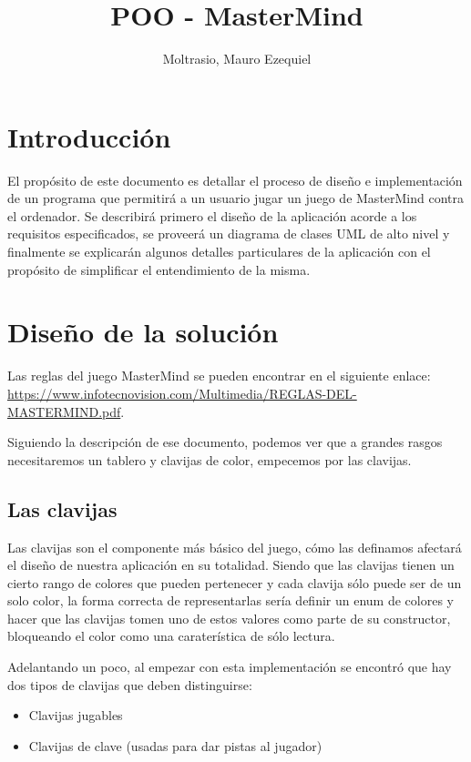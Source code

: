 \documentclass[a4paper,titlepage]{article}
\begin{document}
\title{POO - MasterMind}
\author{Moltrasio, Mauro Ezequiel}
\date{}

\maketitle
\tableofcontents

\section{Introducción}

El propósito de este documento es detallar el proceso de diseño e
implementación de un programa que permitirá a un usuario jugar un juego de
MasterMind contra el ordenador. Se describirá primero el diseño de la
aplicación acorde a los requisitos especificados, se proveerá un diagrama de
clases UML de alto nivel y finalmente se explicarán algunos detalles
particulares de la aplicación con el propósito de simplificar el entendimiento
de la misma.

\section{Diseño de la solución}

Las reglas del juego MasterMind se pueden encontrar en el siguiente enlace:
\url{https://www.infotecnovision.com/Multimedia/REGLAS-DEL-MASTERMIND.pdf}.

Siguiendo la descripción de ese documento, podemos ver que a grandes rasgos
necesitaremos un tablero y clavijas de color, empecemos por las clavijas.

\subsection{Las clavijas}

Las clavijas son el componente más básico del juego, cómo las definamos
afectará el diseño de nuestra aplicación en su totalidad. Siendo que las
clavijas tienen un cierto rango de colores que pueden pertenecer y cada
clavija sólo puede ser de un solo color, la forma correcta de representarlas
sería definir un enum de colores y hacer que las clavijas tomen uno de estos
valores como parte de su constructor, bloqueando el color como una
caraterística de sólo lectura.

Adelantando un poco, al empezar con esta implementación se encontró que hay dos
tipos de clavijas que deben distinguirse:
\begin{itemize}
    \item Clavijas jugables
    \item Clavijas de clave (usadas para dar pistas al jugador)
\end{itemize}
\end{document}

